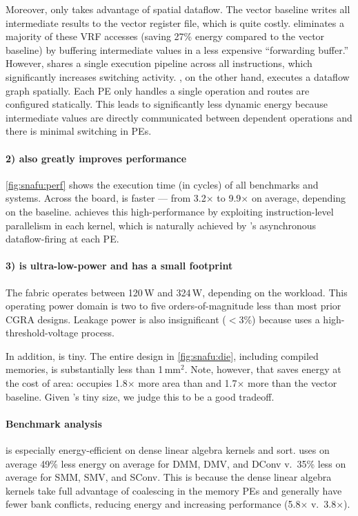 Moreover, only \snafuarch takes advantage of spatial dataflow.
%
The vector baseline writes all intermediate results to the vector register file, which is quite costly.
% 
\manic eliminates a majority of these VRF accesses (saving 27\% energy compared to the vector baseline) by 
buffering intermediate values in a less expensive ``forwarding buffer.''
% 
However, \manic shares a single execution pipeline across all instructions,
% 
which significantly increases switching activity. 
% 
\snafuarch, on the other hand, executes a dataflow graph spatially.
% 
Each PE only handles a single operation and routes are configured statically.
% 
This leads to significantly less dynamic energy because intermediate values are directly communicated between dependent operations and there is minimal switching in PEs.

\paragraph{2) \snafuarch also greatly improves performance}
\autoref{fig:snafu:perf} shows the execution time (in cycles) of all benchmarks and systems.
% 
Across the board, \snafuarch is faster --- from 3.2$\times$ to 9.9$\times$ on average, depending on the baseline. 
% 
\snafuarch achieves this high-performance by exploiting instruction-level parallelism in each kernel,
%
which is naturally achieved by \snafuframe's asynchronous dataflow-firing at each PE.

\paragraph{3) \snafuarch is ultra-low-power and has a small footprint}
% 
The \snafuarch fabric operates between 120\,\textmu W and 324\,\textmu W, depending on the workload.
% 
This operating power domain is two to five orders-of-magnitude less than most prior CGRA designs.
% 
Leakage power is also insignificant ($<$3\%) because \snafuarch uses a high-threshold-voltage process.
% 

In addition, \snafuarch is tiny.
The entire design in \autoref{fig:snafu:die}, including compiled memories, is substantially less than 1\,mm$^2$.
Note, however, that \snafuarch saves energy at the cost of area:
\snafuarch occupies 1.8$\times$ more area than \manic and 1.7$\times$ more than the vector baseline.
%
Given \snafuarch's tiny size, we judge this to be a good tradeoff.

\paragraph{Benchmark analysis}
\snafuarch is especially energy-efficient on dense linear algebra kernels and sort.
% 
\snafuarch uses on average 49\% less energy on average for DMM, DMV, and DConv v.\ 35\% less on average for SMM, SMV, and SConv. 
% 
This is because the dense linear algebra kernels take full advantage of coalescing in the memory PEs and generally have fewer bank conflicts, reducing energy and increasing performance (5.8$\times$ v.\ 3.8$\times$). 
 
